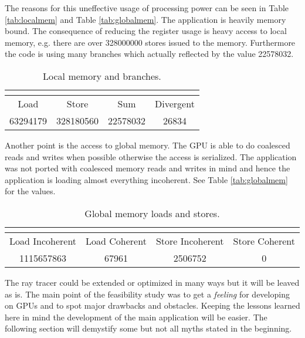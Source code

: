 The reasons for this uneffective usage of processing power can be seen in Table \autoref{tab:localmem} and Table \autoref{tab:globalmem}. The application is heavily memory bound. The consequence of reducing the register usage is heavy access to local memory, e.g. there are over 328000000 stores issued to the memory. Furthermore the code is using many branches which actually reflected by the value 22578032. 

\begin{table}[ht]
    \myfloatalign
  \begin{tabularx}{\textwidth}{cccc} \toprule
	\multicolumn{2}{c}{\spacedlowsmallcaps{Local Memory}} &
	\multicolumn{2}{c}{\spacedlowsmallcaps{Branches}} \\ \midrule
    Load & Store & Sum & Divergent\\
	63294179 & 328180560 & 22578032 & 26834\\
    \bottomrule
  \end{tabularx}
  \caption[Local memory and branches]{Local memory and branches.}
  \label{tab:localmem}
\end{table}

Another point is the access to global memory. The \gls{GPU} is able to do coalesced reads and writes when possible otherwise the access is serialized. 
The application was not ported with coalesced memory reads and writes in mind and hence the application is loading almost everything incoherent. See Table \autoref{tab:globalmem} for the values. 

\begin{table}[ht]
    \myfloatalign
  \begin{tabularx}{\textwidth}{cccc} \toprule
	\multicolumn{4}{c}{\spacedlowsmallcaps{Global Memory}} \\ \midrule
    Load Incoherent & Load Coherent & Store Incoherent & Store Coherent \\
	1115657863 & 67961 & 2506752 & 0 \\
    \bottomrule
  \end{tabularx}
  \caption[Global memory loads and stores]{Global memory loads and stores.}
  \label{tab:globalmem}
\end{table}

The ray tracer could be extended or optimized in many ways but it will be leaved as is. The main point of the feasibility study was to get a \emph{feeling} for developing on \glspl{GPU} and to spot major drawbacks and obstacles. Keeping the lessons learned here in mind the development of the main application will be easier. The following section will demystify some but not all myths stated in the beginning.


